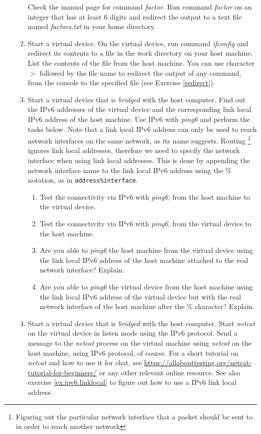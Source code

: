 \documentclass[12pt]{book}
\begin{document}
\begin{enumerate}[label=\arabic*.]
\begin{enumerate}[label=\arabic*.]
Check the manual page for command \emph{factor}. Run command \emph{factor} on an integer that has at least 6 digits and redirect the output to a text file named \emph{factors.txt} in your home directory. 

\item Start a virtual device. On the virtual device, run command \emph{ifconfig} and redirect its contents to a file in the work directory on your host machine. List the contents of the file from the host machine. You can use character $>$ followed by the file name to redirect the output of any command, from the console to the specified file (see Exercise \ref{redirect}).

\item\label{ex.ipv6.linklocal} Start a virtual device that is \emph{bridged} with the host computer. Find out the IPv6 addresses of the virtual device and the corresponding link local IPv6 address of the host machine. Use IPv6 with \emph{ping6} and perform the tasks below. Note that a link local IPv6 address can only be used to reach network interfaces on the same network, as its name suggests. Routing \footnote{Figuring out the particular network interface that a packet should be sent to in order to reach another network} ignores link local addresses, therefore we need to specify the network interface when using link local addresses. This is done by appending the network interface name to the link local IPv6 address using the \% notation, as in \verb$address%interface$. 
\begin{enumerate}[label=(\alph*)]
\item Test the connectivity via IPv6 with \emph{ping6}, from the host machine to the virtual device.
\item Test the connectivity via IPv6 with \emph{ping6}, from the virtual device to the host machine.
\item Are you able to \emph{ping6} the host machine from the virtual device using the link local IPv6 address of the host machine attached to the real network interface? Explain.
\item Are you able to \emph{ping6} the virtual device from the host machine using the link local IPv6 address of the virtual device but with the real network interface of the host machine after the \% character? Explain.
\end{enumerate}

\item Start a virtual device that is \emph{bridged} with the host computer. Start \emph{netcat} on the virtual device in listen mode using the IPv6 protocol. Send a message to the \emph{netcat} process on the virtual machine using \emph{netcat} on the host machine, using IPv6 protocol, of course. For a short tutorial on \emph{netcat} and how to use it for chat, see \url{https://allabouttesting.org/netcat-tutorial-for-beginners/} or any other relevant online resource. See also exercise \ref{ex.ipv6.linklocal} to figure out how to use a IPv6 link local address.
\end{enumerate}



\end{enumerate}
\end{document}
